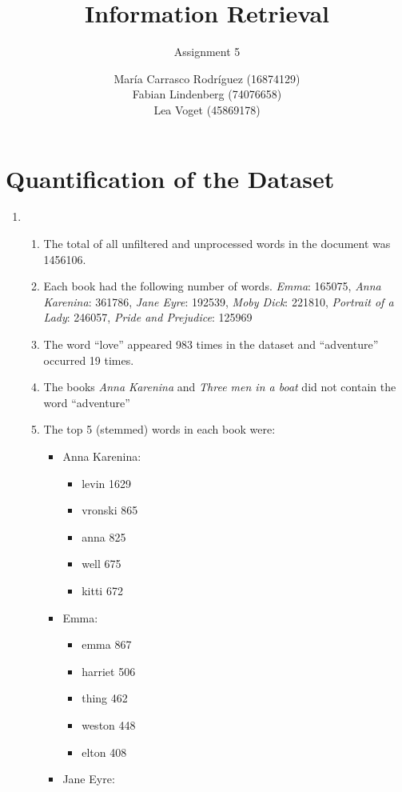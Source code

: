 \documentclass[a4paper,11pt,oneside]{book}
\title{Information Retrieval }
\subtitle{Assignment 5}
\author{ María Carrasco Rodríguez (16874129) \\
		Fabian Lindenberg (74076658)\\
		Lea Voget (45869178)}
\begin{document}
\kostspieligmaketitle


\setcounter{chapter}{2}
\chapter{Quantification of the Dataset}

\begin{enumerate}
	\item \begin{enumerate}
					\item The total of all unfiltered and unprocessed words in the document was 1456106.
					\item Each book had the following number of words. \emph{Emma}: 165075, \emph{Anna Karenina}: 361786, \emph{Jane Eyre}: 192539, \emph{Moby Dick}: 221810,  \emph{Portrait of a Lady}: 246057, \emph{Pride and Prejudice}: 125969 %
					\item The word ``love'' appeared 983 times in the dataset and ``adventure'' occurred 19 times.
					\item The books \emph{Anna Karenina} and \emph{Three men in a boat} did not contain the word ``adventure''
					\item The top 5 (stemmed) words in each book were:
								\begin{itemize}
									\item Anna Karenina:
												\begin{itemize}
													\item{levin		1629}
													\item{vronski	865}
													\item{anna	825}
													\item{well		675}
													\item{kitti		672}
												\end{itemize}
									\item Emma:
												\begin{itemize}
													\item{emma	867}
													\item{harriet	506}
													\item{thing	462}
													\item{weston	448}
													\item{elton	408}
												\end{itemize}
									\item Jane Eyre:

\end{itemize}
\end{enumerate}
\end{enumerate}
\end{document}
